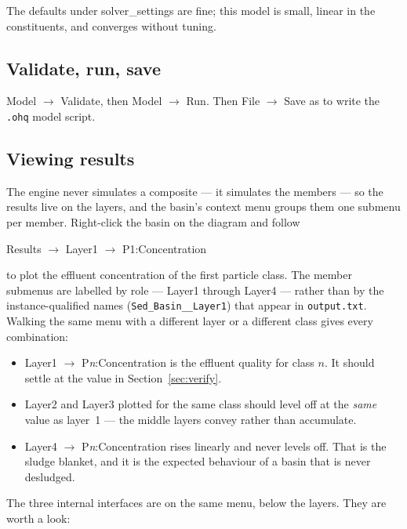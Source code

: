 \documentclass[11pt,a4paper]{article}
\newcommand{\code}[1]{\texttt{\small #1}}
\newcommand{\file}[1]{\texttt{\small #1}}
\newcommand{\menu}[1]{\textsf{#1}}
\begin{document}
The defaults under \menu{solver\_settings} are fine; this model is small, linear
in the constituents, and converges without tuning.

\subsection{Validate, run, save}

\menu{Model $\rightarrow$ Validate}, then \menu{Model $\rightarrow$ Run}. Then
\menu{File $\rightarrow$ Save as} to write the \file{.ohq} model script.

\subsection{Viewing results}
\label{sec:viewing}

The engine never simulates a composite --- it simulates the members --- so the
results live on the layers, and the basin's context menu groups them one
submenu per member. Right-click the basin on the diagram and follow

\begin{center}
\menu{Results} $\rightarrow$ \menu{Layer1} $\rightarrow$ \menu{P1:Concentration}
\end{center}

\noindent
to plot the effluent concentration of the first particle class. The member
submenus are labelled by role --- \menu{Layer1} through \menu{Layer4} --- rather
than by the instance-qualified names (\code{Sed\_Basin\_\_Layer1}) that appear in
\file{output.txt}. Walking the same menu with a different layer or a different
class gives every combination:

\begin{itemize}[leftmargin=1.4em]
\item \menu{Layer1} $\rightarrow$ \menu{P\emph{n}:Concentration} is the effluent
      quality for class $n$. It should settle at the value in
      Section~\ref{sec:verify}.
\item \menu{Layer2} and \menu{Layer3} plotted for the same class should level off
      at the \emph{same} value as layer~1 --- the middle layers convey rather
      than accumulate.
\item \menu{Layer4} $\rightarrow$ \menu{P\emph{n}:Concentration} rises linearly
      and never levels off. That is the sludge blanket, and it is the expected
      behaviour of a basin that is never desludged.
\end{itemize}

The three internal interfaces are on the same menu, below the layers. They are
worth a look:
\end{document}
